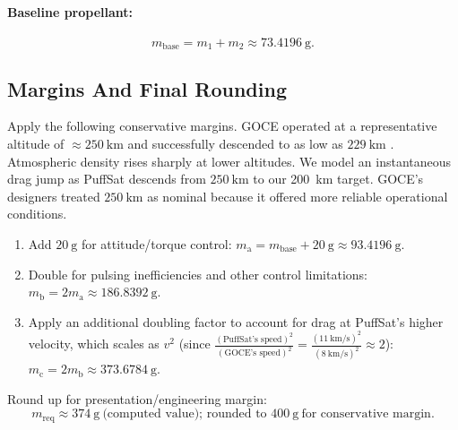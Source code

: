 \documentclass{article}
\begin{document}
\paragraph{Baseline propellant:}
\[
m_{\mathrm{base}} = m_1 + m_2 \approx \SI{73.4196}{\g}.
\]

\subsection*{Margins And Final Rounding}
Apply the following conservative margins. GOCE operated at a representative altitude of $\approx \SI{250}{\kilo\meter}$ and successfully descended to as low as $\SI{229}{\kilo\meter}$ \cite{goce_229km}. Atmospheric density rises sharply at lower altitudes. We model an instantaneous drag jump as PuffSat descends from $\SI{250}{\kilo\meter}$ to our \SI{200}{\kilo\meter} target. GOCE's designers treated $\SI{250}{\kilo\meter}$ as nominal because it offered more reliable operational conditions.
\begin{enumerate}
  \item Add \(\SI{20}{\g}\) for attitude/torque control: \(m_{\mathrm{a}} = m_{\mathrm{base}} + \SI{20}{\g} \approx \SI{93.4196}{\g}.\)
  \item Double for pulsing inefficiencies and other control limitations: \(m_{\mathrm{b}} = 2 m_{\mathrm{a}} \approx \SI{186.8392}{\g}.\)
  \item Apply an additional doubling factor to account for drag at PuffSat's higher velocity, which scales as \(v^2\) (since $\frac{(\text{PuffSat's speed})^2}{(\text{GOCE's speed})^2} = \frac{\left(\SI{11}{\kilo\meter\per\second}\right)^2}{\left(\SI{8}{\kilo\meter\per\second}\right)^2}
 \approx 2$): \(m_{\mathrm{c}} = 2 m_{\mathrm{b}} \approx \SI{373.6784}{\g}.\)

\end{enumerate}

Round up for presentation/engineering margin:
\[
\boxed{m_{\mathrm{req}} \approx \SI{374}{\g}\ \text{(computed value); rounded to }\SI{400}{\g}\ \text{for conservative margin}.}
\]
\end{document}
